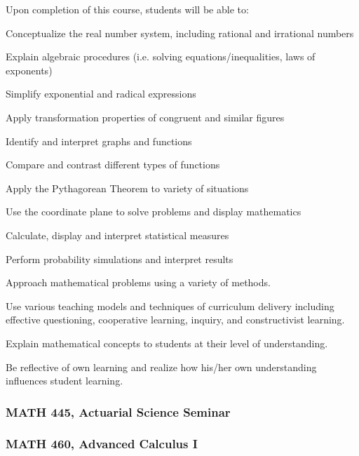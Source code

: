 
Upon completion of this course, students will be able to: 

\begin{alphalist}
\item Conceptualize the real number system, including rational and irrational numbers 
\item Explain algebraic procedures (i.e. solving equations/inequalities, laws of exponents) 
\item Simplify exponential and radical expressions 
\item Apply transformation properties of congruent and similar figures 
\item Identify and interpret graphs and functions 
\item Compare and contrast different types of functions 
\item Apply the Pythagorean Theorem to variety of situations 
\item Use the coordinate plane to solve problems and display mathematics 
\item Calculate, display and interpret statistical measures 
\item Perform probability simulations and interpret results 
\item Approach mathematical problems using a variety of methods. 
\item Use various teaching models and techniques of curriculum delivery including effective questioning, cooperative learning, inquiry, and constructivist learning. 
\item Explain mathematical concepts to students at their level of understanding. 
\item Be reflective of own learning and realize how his/her own understanding influences student learning.
\end{alphalist}

\subsubsection*{MATH 445, Actuarial Science Seminar}


\subsubsection*{MATH 460, Advanced Calculus I}

